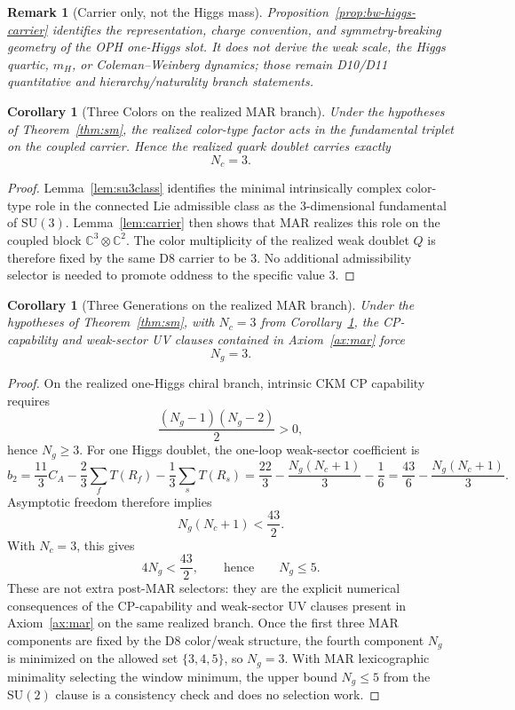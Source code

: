 \documentclass[11pt]{article}
\newtheorem{corollary}[theorem]{Corollary}
\newtheorem{remark}[theorem]{Remark}
\newcommand{\SU}{\mathrm{SU}}
\begin{document}
\begin{remark}[Carrier only, not the Higgs mass]
Proposition~\ref{prop:bw-higgs-carrier} identifies the representation, charge convention, and symmetry-breaking geometry of the OPH one-Higgs slot. It does not derive the weak scale, the Higgs quartic, \(m_H\), or Coleman--Weinberg dynamics; those remain D10/D11 quantitative and hierarchy/naturality branch statements.
\end{remark}

\begin{corollary}[Three Colors on the realized MAR branch]\label{cor:nc}
Under the hypotheses of Theorem~\ref{thm:sm}, the realized color-type factor acts in the fundamental triplet on the coupled carrier. Hence the realized quark doublet carries exactly
\[
N_c=3.
\]
\end{corollary}

\begin{proof}
Lemma~\ref{lem:su3class} identifies the minimal intrinsically complex color-type role in the connected Lie admissible class as the \(3\)-dimensional fundamental of \(\SU(3)\). Lemma~\ref{lem:carrier} then shows that MAR realizes this role on the coupled block \(\mathbb C^3\otimes\mathbb C^2\). The color multiplicity of the realized weak doublet \(Q\) is therefore fixed by the same D8 carrier to be \(3\). No additional admissibility selector is needed to promote oddness to the specific value \(3\).
\end{proof}

\begin{corollary}[Three Generations on the realized MAR branch]\label{cor:ng}
Under the hypotheses of Theorem~\ref{thm:sm}, with \(N_c=3\) from Corollary~\ref{cor:nc}, the CP-capability and weak-sector UV clauses contained in Axiom~\ref{ax:mar} force
\[
N_g=3.
\]
\end{corollary}

\begin{proof}
On the realized one-Higgs chiral branch, intrinsic CKM CP capability requires
\[
\frac{(N_g-1)(N_g-2)}{2}>0,
\]
hence $N_g\ge 3$. For one Higgs doublet, the one-loop weak-sector coefficient is
\[
b_2=\frac{11}{3}C_A-\frac{2}{3}\sum_f T(R_f)-\frac{1}{3}\sum_s T(R_s)
=
\frac{22}{3}-\frac{N_g(N_c+1)}{3}-\frac16
=
\frac{43}{6}-\frac{N_g(N_c+1)}{3}.
\]
Asymptotic freedom therefore implies
\[
N_g(N_c+1)<\frac{43}{2}.
\]
With \(N_c=3\), this gives
\[
4N_g<\frac{43}{2},
\qquad\text{hence}\qquad
N_g\le 5.
\]
These are not extra post-MAR selectors: they are the explicit numerical consequences of the CP-capability and weak-sector UV clauses present in Axiom~\ref{ax:mar} on the same realized branch. Once the first three MAR components are fixed by the D8 color/weak structure, the fourth component \(N_g\) is minimized on the allowed set \(\{3,4,5\}\), so \(N_g=3\). With MAR lexicographic minimality selecting the window minimum, the upper bound \(N_g\le5\) from the \(\SU(2)\) clause is a consistency check and does no selection work.
\end{proof}
\end{document}
